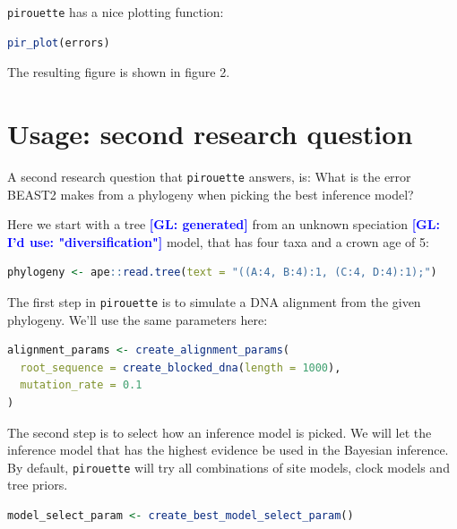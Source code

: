 \documentclass{article}
\newcommand{\giovanni}[1]{\textcolor{blue}{\textbf{[GL: #1]}}}
\begin{document}
\verb;pirouette; has a nice plotting function:

\begin{lstlisting}[language=R, floatplacement=H]
pir_plot(errors)
\end{lstlisting}

The resulting figure is shown in figure 2.

\section{Usage: second research question}

A second research question that \verb;pirouette; answers, is:
What is the error BEAST2 makes from a phylogeny when
picking the best inference model?

Here we start with a tree \giovanni{generated} from an unknown speciation \giovanni{I'd use: "diversification"} model,
that has four taxa and a crown age of 5:

\begin{lstlisting}[language=R, floatplacement=H]
phylogeny <- ape::read.tree(text = "((A:4, B:4):1, (C:4, D:4):1);")
\end{lstlisting}

The first step in \verb;pirouette; is to simulate a DNA alignment from the 
given phylogeny. We'll use the same parameters here:

\begin{lstlisting}[language=R, floatplacement=H]
alignment_params <- create_alignment_params(
  root_sequence = create_blocked_dna(length = 1000),
  mutation_rate = 0.1
)
\end{lstlisting}

The second step is to select how an inference model is picked.
We will let the inference model that has the highest evidence be used
in the Bayesian inference. By default, \verb;pirouette; will try
all combinations of site models, clock models and tree priors.

\begin{lstlisting}[language=R, floatplacement=H]
model_select_param <- create_best_model_select_param()
\end{lstlisting}
\end{document}
